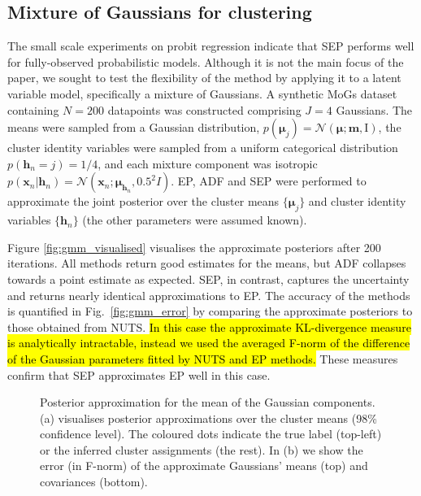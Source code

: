\subsection{Mixture of Gaussians for clustering}
%
The small scale experiments on probit regression indicate that SEP performs well for fully-observed probabilistic models. Although it is not the main focus of the paper, we sought to test the flexibility of the method by applying it to a latent variable model, specifically a mixture of Gaussians. A synthetic MoGs dataset containing $N=200$ datapoints was constructed comprising $J=4$ Gaussians. The means were sampled from a Gaussian distribution, $p(\bm{\mu}_j)= \mathcal{N}(\bm{\mu}; \bm{m}, \mathrm{I})$, the cluster identity variables were sampled from a uniform categorical distribution $p(\bm{h}_n = j) = 1/4$, and each mixture component was isotropic $p(\bm{x}_n | \bm{h}_n) = \mathcal{N}(\bm{x}_n; \bm{\mu}_{\bm{h}_n}, 0.5^2 I)$. EP, ADF and SEP were performed to approximate the joint posterior over the cluster means $\{ \bm{\mu}_j\}$ and cluster identity variables $\{ \bm{h}_n \}$ (the other parameters were assumed known). 

Figure \ref{fig:gmm_visualised} visualises the approximate posteriors after 200 iterations. All methods return good estimates for the means, but ADF collapses towards a point estimate as expected. SEP, in contrast, captures the uncertainty and returns nearly identical approximations to EP. The accuracy of the methods is quantified in Fig.~\ref{fig:gmm_error} by comparing the approximate posteriors to those obtained from NUTS. \hl{In this case the approximate KL-divergence measure is analytically intractable, instead we used the averaged F-norm of the difference of the Gaussian parameters fitted by NUTS and EP methods.} These measures confirm that SEP approximates EP well in this case.

\begin{figure}
\centering
\def\svgwidth{0.45\linewidth}
\subfigure[\label{fig:gmm_visualised}]{
}
%
\hspace{0.1in}
%
\def\svgwidth{0.35\linewidth}
\subfigure[\label{fig:gmm_error}]{
}
\caption{Posterior approximation for the mean of the Gaussian components. (a) visualises posterior approximations over the cluster means (98\% confidence level). The coloured dots indicate the true label (top-left) or the inferred cluster assignments (the rest). In (b) we show the error (in F-norm) of the approximate Gaussians' means (top) and covariances (bottom). }
\end{figure}
